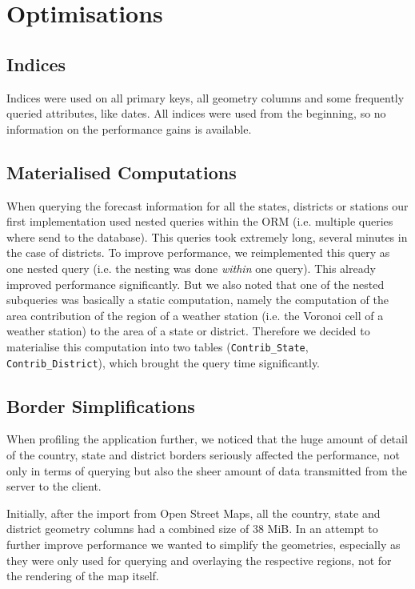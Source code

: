 \documentclass[paper=a4, fontsize=11pt]{scrartcl} %
\numberwithin{equation}{section} %
\numberwithin{figure}{section} %
\numberwithin{table}{section} %
\begin{document}
\section{Optimisations}

\subsection{Indices}

Indices were used on all primary keys, all geometry columns and some frequently queried attributes, like dates. All indices were used from the beginning, so no information on the performance gains is available.

\subsection{Materialised Computations}

When querying the forecast information for all the states, districts or stations our first implementation used nested queries within the ORM (i.e. multiple queries where send to the database). This queries took extremely long, several minutes in the case of districts. To improve performance, we reimplemented this query as one nested query (i.e. the nesting was done \emph{within} one query). This already improved performance significantly. But we also noted that one of the nested subqueries was basically a static computation, namely the computation of the area contribution of the region of a weather station (i.e. the Voronoi cell of a weather station) to the area of a state or district. Therefore we decided to materialise this computation into two tables (\lstinline{Contrib_State}, \lstinline{Contrib_District}), which brought the query time significantly. 

\subsection{Border Simplifications}	

When profiling the application further, we noticed that the huge amount of detail of the country, state and district borders seriously affected the performance, not only in terms of querying but also the sheer amount of data transmitted from the server to the client. 

Initially, after the import from Open Street Maps, all the country, state and district geometry columns had a combined size of 38 MiB. In an attempt to further improve performance we wanted to simplify the geometries, especially as they were only used for querying and overlaying the respective regions, not for the rendering of the map itself.
\end{document}
